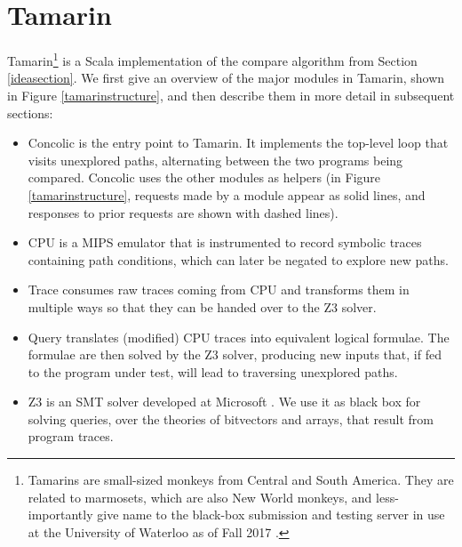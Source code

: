 \documentclass{llncs}
\begin{document}
\section{Tamarin}

Tamarin\footnote{Tamarins are small-sized monkeys from Central and South America. They are related to marmosets, which are also New World monkeys, and less-importantly give name to the black-box submission and testing server in use at the University of Waterloo as of Fall 2017 \cite{spacco2006marmoset}.} is a Scala implementation of the \textsf{compare} algorithm from Section \ref{ideasection}. We first give an overview of the major modules in Tamarin, shown in Figure \ref{tamarinstructure}, and then describe them in more detail in subsequent sections:

\begin{itemize}
\item \textsf{Concolic} is the entry point to Tamarin. It implements the top-level loop that visits unexplored paths, alternating between the two programs being compared. \textsf{Concolic} uses the other modules as helpers (in Figure \ref{tamarinstructure}, requests made by a module appear as solid lines, and responses to prior requests are shown with dashed lines).
\item \textsf{CPU} is a MIPS emulator that is instrumented to record symbolic traces containing path conditions, which can later be negated to explore new paths.
\item \textsf{Trace} consumes raw traces coming from \textsf{CPU} and transforms them in multiple ways so that they can be handed over to the \textsf{Z3} solver.
\item \textsf{Query} translates (modified) \textsf{CPU} traces into equivalent logical formulae. The formulae are then solved by the \textsf{Z3} solver, producing new inputs that, if fed to the program under test, will lead to traversing unexplored paths.
\item \textsf{Z3} is an SMT solver developed at Microsoft \cite{de2008z3}. We use it as black box for solving queries, over the theories of bitvectors and arrays, that result from program traces.
\end{itemize}
\end{document}
